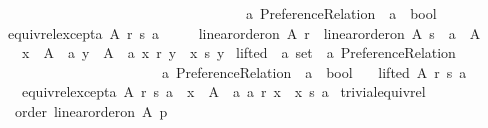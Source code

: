 \begin{isabellebody}
\ \ \ \ \ \ \ \ \ \ \ \ \ \ \ \ \ \ \ \ \ \ \ \ \ \ \ \ \ \ \ \ \ \ \ \ {\isacharprime}{\kern0pt}a\ Preference{\isacharunderscore}{\kern0pt}Relation\ {\isasymRightarrow}\ {\isacharprime}{\kern0pt}a\ {\isasymRightarrow}\ bool{\isachardoublequoteclose}\ \isanewline
\ \ {\isachardoublequoteopen}equiv{\isacharunderscore}{\kern0pt}rel{\isacharunderscore}{\kern0pt}except{\isacharunderscore}{\kern0pt}a\ A\ r\ s\ a\ {\isasymequiv}\isanewline
\ \ \ \ linear{\isacharunderscore}{\kern0pt}order{\isacharunderscore}{\kern0pt}on\ A\ r\ {\isasymand}\ linear{\isacharunderscore}{\kern0pt}order{\isacharunderscore}{\kern0pt}on\ A\ s\ {\isasymand}\ a\ {\isasymin}\ A\ {\isasymand}\isanewline
\ \ \ \ {\isacharparenleft}{\kern0pt}{\isasymforall}x\ {\isasymin}\ A\ {\isacharminus}{\kern0pt}\ {\isacharbraceleft}{\kern0pt}a{\isacharbraceright}{\kern0pt}{\isachardot}{\kern0pt}\ {\isasymforall}y\ {\isasymin}\ A\ {\isacharminus}{\kern0pt}\ {\isacharbraceleft}{\kern0pt}a{\isacharbraceright}{\kern0pt}{\isachardot}{\kern0pt}\ x\ {\isasympreceq}\isactrlsub r\ y\ {\isasymlongleftrightarrow}\ x\ {\isasympreceq}\isactrlsub s\ y{\isacharparenright}{\kern0pt}{\isachardoublequoteclose}\isanewline
\isanewline
{}\isamarkupfalse%
\ lifted\ {\isacharcolon}{\kern0pt}{\isacharcolon}{\kern0pt}\ {\isachardoublequoteopen}{\isacharprime}{\kern0pt}a\ set\ {\isasymRightarrow}\ {\isacharprime}{\kern0pt}a\ Preference{\isacharunderscore}{\kern0pt}Relation\ {\isasymRightarrow}\isanewline
\ \ \ \ \ \ \ \ \ \ \ \ \ \ \ \ \ \ \ \ \ \ \ \ {\isacharprime}{\kern0pt}a\ Preference{\isacharunderscore}{\kern0pt}Relation\ {\isasymRightarrow}\ {\isacharprime}{\kern0pt}a\ {\isasymRightarrow}\ bool{\isachardoublequoteclose}\ \isanewline
\ \ {\isachardoublequoteopen}lifted\ A\ r\ s\ a\ {\isasymequiv}\isanewline
\ \ \ \ equiv{\isacharunderscore}{\kern0pt}rel{\isacharunderscore}{\kern0pt}except{\isacharunderscore}{\kern0pt}a\ A\ r\ s\ a\ {\isasymand}\ {\isacharparenleft}{\kern0pt}{\isasymexists}x\ {\isasymin}\ A\ {\isacharminus}{\kern0pt}\ {\isacharbraceleft}{\kern0pt}a{\isacharbraceright}{\kern0pt}{\isachardot}{\kern0pt}\ a\ {\isasympreceq}\isactrlsub r\ x\ {\isasymand}\ x\ {\isasympreceq}\isactrlsub s\ a{\isacharparenright}{\kern0pt}{\isachardoublequoteclose}\isanewline
\isanewline
{}\isamarkupfalse%
\ trivial{\isacharunderscore}{\kern0pt}equiv{\isacharunderscore}{\kern0pt}rel{\isacharcolon}{\kern0pt}\isanewline
\ \ \ order{\isacharcolon}{\kern0pt}\ {\isachardoublequoteopen}linear{\isacharunderscore}{\kern0pt}order{\isacharunderscore}{\kern0pt}on\ A\ p{\isachardoublequoteclose}\isanewline

\end{isabellebody}
